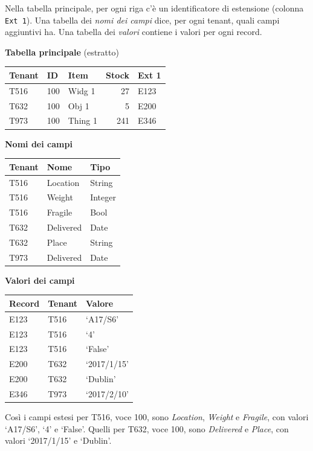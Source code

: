 \begin{esempio}
Nella tabella principale, per ogni riga c'è un identificatore di estensione (colonna \texttt{Ext 1}). Una tabella
dei \emph{nomi dei campi} dice, per ogni tenant, quali campi aggiuntivi ha. Una tabella dei \emph{valori} contiene i
valori per ogni record.

\smallskip
\small
\begin{minipage}[t]{0.46\linewidth}
\textbf{Tabella principale} (estratto)\par\smallskip
\begin{tabular}{@{}lllr@{\qquad}l@{}}
\toprule
Tenant & ID & Item & Stock & Ext 1 \\
\midrule
T516 & 100 & Widg 1 & 27 & E123 \\
T632 & 100 & Obj 1 & 5 & E200 \\
T973 & 100 & Thing 1 & 241 & E346 \\
\bottomrule
\end{tabular}
\end{minipage}\hfill
\begin{minipage}[t]{0.5\linewidth}
\textbf{Nomi dei campi}\par\smallskip
\begin{tabular}{@{}lll@{}}
\toprule
Tenant & Nome & Tipo \\
\midrule
T516 & Location & String \\
T516 & Weight & Integer \\
T516 & Fragile & Bool \\
T632 & Delivered & Date \\
T632 & Place & String \\
T973 & Delivered & Date \\
\bottomrule
\end{tabular}
\end{minipage}

\medskip
\begin{minipage}[t]{0.6\linewidth}
\textbf{Valori dei campi}\par\smallskip
\begin{tabular}{@{}lll@{}}
\toprule
Record & Tenant & Valore \\
\midrule
E123 & T516 & `A17/S6' \\
E123 & T516 & `4' \\
E123 & T516 & `False' \\
E200 & T632 & `2017/1/15' \\
E200 & T632 & `Dublin' \\
E346 & T973 & `2017/2/10' \\
\bottomrule
\end{tabular}
\end{minipage}

\smallskip
Così i campi estesi per T516, voce 100, sono \emph{Location}, \emph{Weight} e \emph{Fragile}, con valori
`A17/S6', `4' e `False'. Quelli per T632, voce 100, sono \emph{Delivered} e \emph{Place}, con valori `2017/1/15' e
`Dublin'.
\end{esempio}

